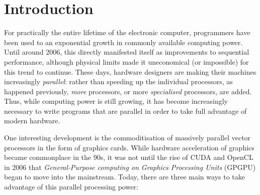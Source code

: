 \chapter{Introduction}

For practically the entire lifetime of the electronic computer,
programmers have been used to an exponential growth in commonly
available computing power.  Until around 2006, this directly
manifested itself as improvements to sequential performance, although
physical limits made it uneconomical (or impossible) for this trend to
continue.  These days, hardware designers are making their machines
increasingly \textit{parallel}: rather than speeding up the individual
processors, as happened previously, \textit{more} processors, or more
\textit{specialised} processors, are added.  Thus, while computing
power is still growing, it has become increasingly necessary to write
programs that are parallel in order to take full advantage of modern
hardware.

One interesting development is the commoditisation of massively
parallel vector processors in the form of graphics cards.  While
hardware acceleration of graphics became commonplace in the 90s, it
was not until the rise of CUDA and OpenCL in 2006 that
\textit{General-Purpose computing on Graphics Processing Units}
(GPGPU) began to move into the mainstream.  Today, there are three
main ways to take advantage of this parallel processing power:

